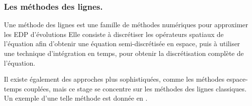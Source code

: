     \subsubsection{Les méthodes des lignes.}
    \begin{definition}
        Une méthode des lignes est une famille de méthodes numériques pour approximer les EDP d'évolutions
        Elle consiste à discrétiser les opérateurs spatiaux de l'équation afin d'obtenir une équation semi-discrétisée en espace,
        puis à utiliser une technique d'intégration en temps, pour obtenir la discrétisation complète de l'équation.
    \end{definition}

    Il existe également des approches plus sophistiquées, comme les méthodes espace-temps couplées, mais ce stage se concentre sur les méthodes des lignes classiques. Un exemple d'une telle méthode est donnée en \cite{DARU2004563}.
